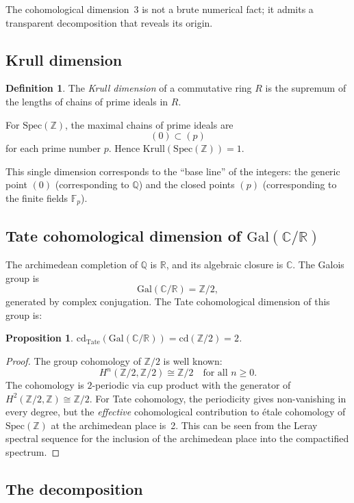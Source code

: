 \documentclass[12pt,a4paper]{article}
\newtheorem{proposition}[theorem]{Proposition}
\theoremstyle{definition}
\newtheorem{definition}[theorem]{Definition}
\newcommand{\Spec}{\mathrm{Spec}}
\newcommand{\Gal}{\mathrm{Gal}}
\newcommand{\cd}{\mathrm{cd}}
\newcommand{\Krull}{\mathrm{Krull}}
\newcommand{\ZZ}{\mathbb{Z}}
\newcommand{\QQ}{\mathbb{Q}}
\newcommand{\RR}{\mathbb{R}}
\newcommand{\CC}{\mathbb{C}}
\newcommand{\FF}{\mathbb{F}}
\begin{document}
The cohomological dimension~3 is not a brute numerical fact; it admits a transparent
decomposition that reveals its origin.

\subsection{Krull dimension}

\begin{definition}
The \emph{Krull dimension} of a commutative ring $R$ is the supremum of the lengths
of chains of prime ideals in $R$.
\end{definition}

For $\Spec(\ZZ)$, the maximal chains of prime ideals are
\[
  (0) \subset (p)
\]
for each prime number $p$. Hence $\Krull(\Spec(\ZZ)) = 1$.

This single dimension corresponds to the ``base line'' of the integers: the generic
point $(0)$ (corresponding to $\QQ$) and the closed points $(p)$ (corresponding to
the finite fields $\FF_p$).

\subsection{Tate cohomological dimension of $\Gal(\CC/\RR)$}

The archimedean completion of $\QQ$ is $\RR$, and its algebraic closure is $\CC$.
The Galois group is
\[
  \Gal(\CC/\RR) = \ZZ/2,
\]
generated by complex conjugation. The Tate cohomological dimension of this group is:

\begin{proposition}\label{prop:tate}
$\cd_{\mathrm{Tate}}(\Gal(\CC/\RR)) = \cd(\ZZ/2) = 2$.
\end{proposition}

\begin{proof}
The group cohomology of $\ZZ/2$ is well known:
\[
  H^n(\ZZ/2, \ZZ/2) \cong \ZZ/2 \quad \text{for all } n \geq 0.
\]
The cohomology is $2$-periodic via cup product with the generator of
$H^2(\ZZ/2, \ZZ) \cong \ZZ/2$. For Tate cohomology, the periodicity gives
non-vanishing in every degree, but the \emph{effective} cohomological contribution
to \'etale cohomology of $\Spec(\ZZ)$ at the archimedean place is~2. This can be seen
from the Leray spectral sequence for the inclusion of the archimedean place into
the compactified spectrum.
\end{proof}

\subsection{The decomposition}
\end{document}
